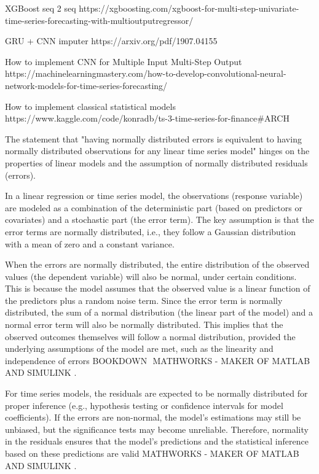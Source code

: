XGBoost seq 2 seq 
https://xgboosting.com/xgboost-for-multi-step-univariate-time-series-forecasting-with-multioutputregressor/


GRU + CNN imputer 
https://arxiv.org/pdf/1907.04155


How to implement CNN for Multiple Input Multi-Step Output
https://machinelearningmastery.com/how-to-develop-convolutional-neural-network-models-for-time-series-forecasting/


How to implement classical statistical models 
https://www.kaggle.com/code/konradb/ts-3-time-series-for-finance#ARCH










The statement that "having normally distributed errors is equivalent to having normally distributed observations for any linear time series model" hinges on the properties of linear models and the assumption of normally distributed residuals (errors).

In a linear regression or time series model, the observations (response variable) are modeled as a combination of the deterministic part (based on predictors or covariates) and a stochastic part (the error term). The key assumption is that the error terms are normally distributed, i.e., they follow a Gaussian distribution with a mean of zero and a constant variance.

When the errors are normally distributed, the entire distribution of the observed values (the dependent variable) will also be normal, under certain conditions. This is because the model assumes that the observed value is a linear function of the predictors plus a random noise term. Since the error term is normally distributed, the sum of a normal distribution (the linear part of the model) and a normal error term will also be normally distributed. This implies that the observed outcomes themselves will follow a normal distribution, provided the underlying assumptions of the model are met, such as the linearity and independence of errors​
BOOKDOWN
​
MATHWORKS - MAKER OF MATLAB AND SIMULINK
.

For time series models, the residuals are expected to be normally distributed for proper inference (e.g., hypothesis testing or confidence intervals for model coefficients). If the errors are non-normal, the model's estimations may still be unbiased, but the significance tests may become unreliable. Therefore, normality in the residuals ensures that the model's predictions and the statistical inference based on these predictions are valid​
MATHWORKS - MAKER OF MATLAB AND SIMULINK
.

